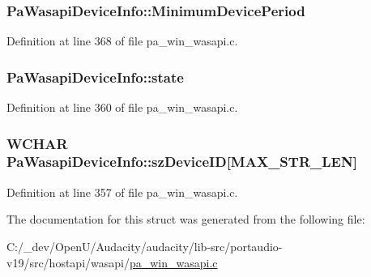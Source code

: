 \subsubsection[{\texorpdfstring{Minimum\+Device\+Period}{MinimumDevicePeriod}}]{ Pa\+Wasapi\+Device\+Info\+::\+Minimum\+Device\+Period}\hypertarget{struct_pa_wasapi_device_info_addab082d2de47dd4039b87efe9d73d71}{}\label{struct_pa_wasapi_device_info_addab082d2de47dd4039b87efe9d73d71}


Definition at line 368 of file pa\+\_\+win\+\_\+wasapi.\+c.

\subsubsection[{\texorpdfstring{state}{state}}]{ Pa\+Wasapi\+Device\+Info\+::state}\hypertarget{struct_pa_wasapi_device_info_a51051f47a56a2ba215784912fcc64f90}{}\label{struct_pa_wasapi_device_info_a51051f47a56a2ba215784912fcc64f90}


Definition at line 360 of file pa\+\_\+win\+\_\+wasapi.\+c.

\subsubsection[{\texorpdfstring{sz\+Device\+ID}{szDeviceID}}]{\setlength{\rightskip}{0pt plus 5cm}W\+C\+H\+AR Pa\+Wasapi\+Device\+Info\+::sz\+Device\+ID\mbox{[}{\bf M\+A\+X\+\_\+\+S\+T\+R\+\_\+\+L\+EN}\mbox{]}}\hypertarget{struct_pa_wasapi_device_info_ab4eccd4b97f01c9d969e28568dc33a13}{}\label{struct_pa_wasapi_device_info_ab4eccd4b97f01c9d969e28568dc33a13}


Definition at line 357 of file pa\+\_\+win\+\_\+wasapi.\+c.



The documentation for this struct was generated from the following file\+:\begin{DoxyCompactItemize}
\item 
C\+:/\+\_\+dev/\+Open\+U/\+Audacity/audacity/lib-\/src/portaudio-\/v19/src/hostapi/wasapi/\hyperlink{pa__win__wasapi_8c}{pa\+\_\+win\+\_\+wasapi.\+c}\end{DoxyCompactItemize}
